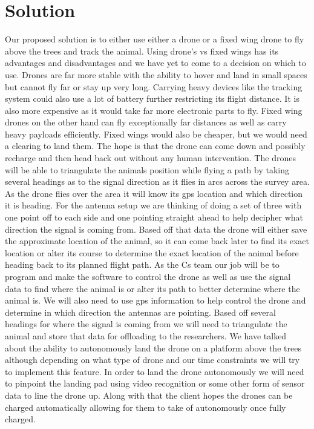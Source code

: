 \documentclass[onecolumn, draftclsnofoot,10pt, compsoc]{IEEEtran}
\begin{document}
\section{Solution}
Our proposed solution is to either use either a drone or a fixed wing drone to fly above the trees and track the animal. Using drone’s vs fixed wings has its advantages and disadvantages and we have yet to come to a decision on which to use. Drones are far more stable with the ability to hover and land in small spaces but cannot fly far or stay up very long. Carrying heavy devices like the tracking system could also use a lot of battery further restricting its flight distance. It is also more expensive as it would take far more electronic parts to fly. Fixed wing drones on the other hand can fly exceptionally far distances as well as carry heavy payloads efficiently. Fixed wings would also be cheaper, but we would need a clearing to land them. The hope is that the drone can come down and possibly recharge and then head back out without any human intervention. The drones will be able to triangulate the animals position while flying a path by taking several headings as to the signal direction as it flies in arcs across the survey area. As the drone flies over the area it will know its gps location and which direction it is heading. For the antenna setup we are thinking of doing a set of three with one point off to each side and one pointing straight ahead to help decipher what direction the signal is coming from. Based off that data the drone will either save the approximate location of the animal, so it can come back later to find its exact location or alter its course to determine the exact location of the animal before heading back to its planned flight path. As the Cs team our job will be to program and make the software to control the drone as well as use the signal data to find where the animal is or alter its path to better determine where the animal is. We will also need to use gps information to help control the drone and determine in which direction the antennas are pointing. Based off several headings for where the signal is coming from we will need to triangulate the animal and store that data for offloading to the researchers. We have talked about the ability to autonomously land the drone on a platform above the trees although depending on what type of drone and our time constraints we will try to implement this feature. In order to land the drone autonomously we will need to pinpoint the landing pad using video recognition or some other form of sensor data to line the drone up. Along with that the client hopes the drones can be charged automatically allowing for them to take of autonomously once fully charged.
\end{document}
